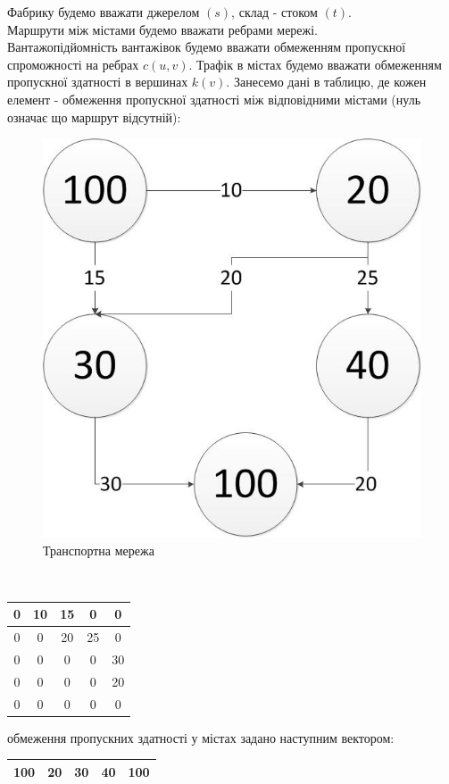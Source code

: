 \documentclass[a4paper,14pt,russian,ukrainian,oneside,final]{extreport}
\begin{document}
\indent Фабрику будемо вважати джерелом $(s)$, склад - стоком $(t)$. \\
Маршрути між містами будемо вважати ребрами мережі.\\
Вантажопідйомність вантажівок будемо вважати обмеженням пропускної спроможності на ребрах $c(u,v)$.
Трафік в містах будемо вважати обмеженням пропускної здатності в вершинах $k(v)$.
Занесемо дані в таблицю, де кожен елемент - обмеження пропускної здатності між відповідними містами (нуль означає що маршрут відсутній):
\begin{figure}[h]
\begin{center}
\includegraphics[scale=0.65]{p1.jpg}
\caption{Транспортна мережа}
\end{center}
\end{figure}
\\
\begin{center}
\begin{tabular}{|c|c|c|c|c|}
\hline
0&10&15&0&0 \\
\hline
0&0&20&25&0 \\
\hline
0&0&0&0&30 \\
\hline
0&0&0&0&20 \\
\hline
0&0&0&0&0 \\
\hline
\end{tabular}
\end{center}
обмеження пропускних здатності у містах задано наступним вектором:
\begin{center}
\begin{tabular}{|c|c|c|c|c|}
\hline
100&20&30&40&100 \\
\hline
\end{tabular}
\end{center}
\end{document}
